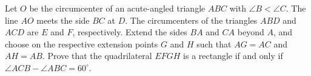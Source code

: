 Let $O$ be the circumcenter of an acute-angled triangle $ABC$ with $\angle B < \angle C$. The line $AO$ meets the side $BC$ at $D$. The circumcenters of the triangles $ABD$ and $ACD$ are $E$ and $F$, respectively. Extend the sides $BA$ and $CA$ beyond $A$, and choose on the respective extension points $G$ and $H$ such that $AG = AC$ and $AH = AB$. Prove that the quadrilateral $EFGH$ is a rectangle if and only if $\angle ACB - \angle ABC = 60^\circ$.
